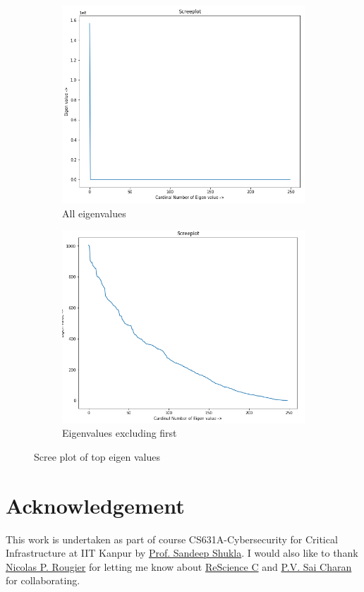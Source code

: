 \begin{figure}[h]	
	\centering
	\begin{subfigure}[t]{0.45\textwidth}
		\centering
		\includegraphics[width=\textwidth]{imgs/scree1.png}
		\caption{All eigenvalues}\label{fig:1a}		
	\end{subfigure}
	\qquad
	\begin{subfigure}[t]{0.45\textwidth}
		\centering
		\includegraphics[width=\textwidth]{imgs/scree2.png}
		\caption{Eigenvalues excluding first}\label{fig:1b}
	\end{subfigure}
	\caption{Scree plot of top eigen values}\label{fig:scree}
\end{figure}

\section*{Acknowledgement}

This work is undertaken as part of course CS631A-Cybersecurity for Critical Infrastructure at IIT Kanpur by \href{https://security.cse.iitk.ac.in/node/96}{Prof. Sandeep Shukla}. I would also like to thank \href{https://www.labri.fr/perso/nrougier/}{Nicolas P. Rougier} for letting me know about \href{https://rescience.github.io}{ReScience C} and \href{https://www.cse.iitk.ac.in/users/pvcharan/} {P.V. Sai Charan} for collaborating.
